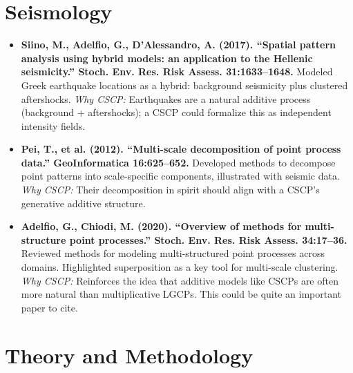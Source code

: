 \documentclass[11pt]{article}
\begin{document}
	\section*{Seismology}
	
	\begin{itemize}
		\item \textbf{Siino, M., Adelfio, G., D’Alessandro, A. (2017). ``Spatial pattern analysis using hybrid models: an application to the Hellenic seismicity.'' Stoch. Env. Res. Risk Assess. 31:1633--1648.}  
		Modeled Greek earthquake locations as a hybrid: background seismicity plus clustered aftershocks.  
		\emph{Why CSCP:} Earthquakes are a natural additive process (background + aftershocks); a CSCP could formalize this as independent intensity fields.
		
		\item \textbf{Pei, T., et al. (2012). ``Multi-scale decomposition of point process data.'' GeoInformatica 16:625--652.}  
		Developed methods to decompose point patterns into scale-specific components, illustrated with seismic data.  
		\emph{Why CSCP:} Their decomposition in spirit should align with a CSCP’s generative additive structure.
		
		\item \textbf{Adelfio, G., Chiodi, M. (2020). ``Overview of methods for multi-structure point processes.'' Stoch. Env. Res. Risk Assess. 34:17--36.}  
		Reviewed methods for modeling multi-structured point processes across domains. Highlighted superposition as a key tool for multi-scale clustering.  
		\emph{Why CSCP:} Reinforces the idea that additive models like CSCPs are often more natural than multiplicative LGCPs. This could be quite an important paper to cite.
	\end{itemize}
	
	\section*{Theory and Methodology}
	
\end{document}
